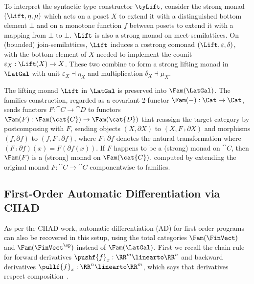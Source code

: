 To interpret the syntactic type constructor $\tyLift$, consider the strong monad $(\Lift, \eta, \mu)$ which
acts on a poset $X$ to extend it with a distinguished bottom element $\bot$ and on a monotone function $f$
between posets to extend it with a mapping from $\bot$ to $\bot$. $\Lift$ is also a strong monad on
meet-semilattices. On (bounded) join-semilattices, $\Lift$ induces a costrong comonad $(\Lift, \varepsilon,
\delta)$, with the bottom element of $X$ needed to implement the counit $\varepsilon_X: \Lift(X) \to X$. These
two combine to form a strong lifting monad in $\LatGal$ with unit $\varepsilon_X \dashv \eta_X$ and
multiplication $\delta_X \dashv \mu_X$.

The lifting monad $\Lift$ in $\LatGal$ is preserved into $\Fam(\LatGal)$. The families construction, regarded
as a covariant 2-functor $\Fam(-): \Cat \to \Cat$, sends functors $F: \cat{C} \to \cat{D}$ to functors
$\Fam(F): \Fam(\cat{C}) \to \Fam(\cat{D})$ that reassign the target category by postcomposing with $F$,
sending objects $(X, \partial X)$ to $(X, F \comp \partial X)$ and morphisms $(f, \partial f)$ to $(f, F \comp
\partial f)$, where $F \comp \partial f$ denotes the natural transformation where $(F \comp \partial f)(x) =
F(\partial f(x))$. If $F$ happens to be a (strong) monad on $\cat{C}$, then $\Fam(F)$ is a (strong) monad on
$\Fam(\cat{C})$, computed by extending the original monad $F: \cat{C} \to \cat{C}$ componentwise to families.

\subsection{First-Order Automatic Differentiation via CHAD}
\label{sec:first-order:autodiff}

As per the CHAD work, automatic differentiation (AD) for first-order programs can also be recovered in this
setup, using the total categories $\Fam(\FinVect)$ and $\Fam(\FinVect^\op)$ instead of $\Fam(\LatGal)$. First
we recall the chain rule for forward derivatives $\pushf{f}_x: \RR^m \linearto \RR^n$ and backward derivatives
$\pullf{f}_x: \RR^n \linearto \RR^m$, which says that derivatives respect composition~\cite{spivak65}.

